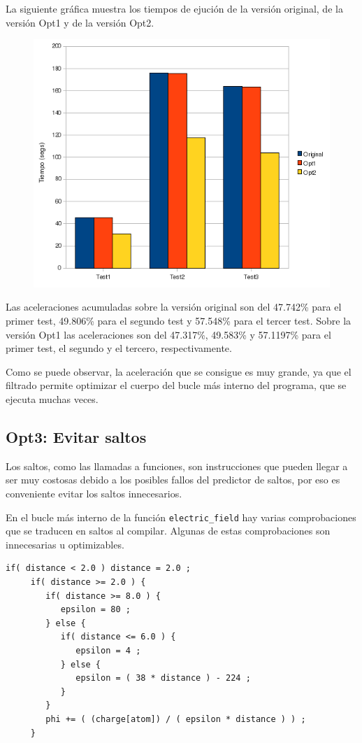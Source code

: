 La siguiente gr\'{a}fica muestra los tiempos de ejuci\'{o}n de la versi\'{o}n
original, de la versi\'{o}n Opt1 y de la versi\'{o}n Opt2.

\begin{figure}[ht]
   \centering
   \includegraphics[keepaspectratio=true,width=.5\textwidth]{figures/opt2-perf}
\end{figure}

Las aceleraciones acumuladas sobre la versi\'{o}n original son del 47.742\% para
el primer test, 49.806\% para el segundo test y 57.548\% para el tercer test.
Sobre la versi\'{o}n Opt1 las aceleraciones son del 47.317\%, 49.583\% y 57.1197\%
para el primer test, el segundo y el tercero, respectivamente.

Como se puede observar, la aceleraci\'{o}n que se consigue es muy grande, ya que
el filtrado permite optimizar el cuerpo del bucle m\'{a}s interno del programa,
que se ejecuta muchas veces.

\subsection{Opt3: Evitar saltos}

Los saltos, como las llamadas a funciones, son instrucciones que pueden llegar
a ser muy costosas debido a  los posibles fallos del predictor de saltos, por
eso es conveniente evitar los saltos innecesarios.

En el bucle m\'{a}s interno de la funci\'{o}n \texttt{electric\_field} hay
varias comprobaciones que se traducen en saltos al compilar. Algunas de estas
comprobaciones son innecesarias u optimizables.

\begin{lstlisting}[]
     if( distance < 2.0 ) distance = 2.0 ;
     if( distance >= 2.0 ) {
        if( distance >= 8.0 ) {
           epsilon = 80 ;
        } else {
           if( distance <= 6.0 ) {
              epsilon = 4 ;
           } else {
              epsilon = ( 38 * distance ) - 224 ;
           }
        }
        phi += ( (charge[atom]) / ( epsilon * distance ) ) ;
     }
\end{lstlisting}

